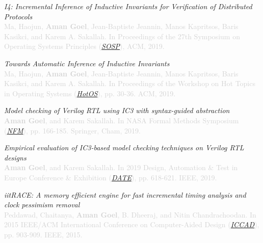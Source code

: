 \documentclass[margin,line,letter]{resume}
\begin{document}
\begin{resume}
\hspace{-2em} \href{https://sosp19.rcs.uwaterloo.ca/program.html}{\faFilePdfO} \hspace{0.3em}
\textit{I4: Incremental Inference of Inductive Invariants for Verification of Distributed Protocols} \\
\textcolor{lightgray}{Ma, Haojun, \textbf{Aman Goel}, Jean-Baptiste Jeannin, Manos Kapritsos, Baris Kasikci, and Karem A. Sakallah. In Proceedings of the 27th Symposium on Operating Systems Principles (\href{https://sosp19.rcs.uwaterloo.ca/}{\textit{SOSP}}), ACM, 2019.}

\hspace{-2em} \href{https://dl.acm.org/citation.cfm?id=3321451}{\faFilePdfO} \hspace{0.3em}
\textit{Towards Automatic Inference of Inductive Invariants} \\
\textcolor{lightgray}{Ma, Haojun, \textbf{Aman Goel}, Jean-Baptiste Jeannin, Manos Kapritsos, Baris Kasikci, and Karem A. Sakallah. In Proceedings of the Workshop on Hot Topics in Operating Systems (\href{https://hotos19.sigops.org/}{\textit{HotOS}}), pp. 30-36. ACM, 2019.}

\hspace{-2em} \href{https://link.springer.com/chapter/10.1007/978-3-030-20652-9_11}{\faFilePdfO} \hspace{0.3em}
\textit{Model checking of Verilog RTL using IC3 with syntax-guided abstraction} \\
\textcolor{lightgray}{\textbf{Aman Goel}, and Karem Sakallah. In NASA Formal Methods Symposium (\href{https://robonaut.jsc.nasa.gov/R2/pages/nfm2019.html}{\textit{NFM}}), pp. 166-185. Springer, Cham, 2019.}

\hspace{-2em} \href{https://ieeexplore.ieee.org/abstract/document/8715289}{\faFilePdfO} \hspace{0.3em}
\textit{Empirical evaluation of IC3-based model checking techniques on Verilog RTL designs} \\
\textcolor{lightgray}{\textbf{Aman Goel}, and Karem Sakallah. In 2019 Design, Automation \& Test in Europe Conference \& Exhibition (\href{https://www.date-conference.com/}{\textit{DATE}}), pp. 618-621. IEEE, 2019.}

\hspace{-2em} \href{https://ieeexplore.ieee.org/abstract/document/7372667}{\faFilePdfO} \hspace{0.3em}
\textit{iitRACE: A memory efficient engine for fast incremental timing analysis and clock pessimism removal} \\
\textcolor{lightgray}{Peddawad, Chaitanya, \textbf{Aman Goel}, B. Dheeraj, and Nitin Chandrachoodan. In 2015 IEEE/ACM International Conference on Computer-Aided Design (\href{https://iccad.com/}{\textit{ICCAD}}), pp. 903-909. IEEE, 2015.}


\end{resume}
\end{document}
